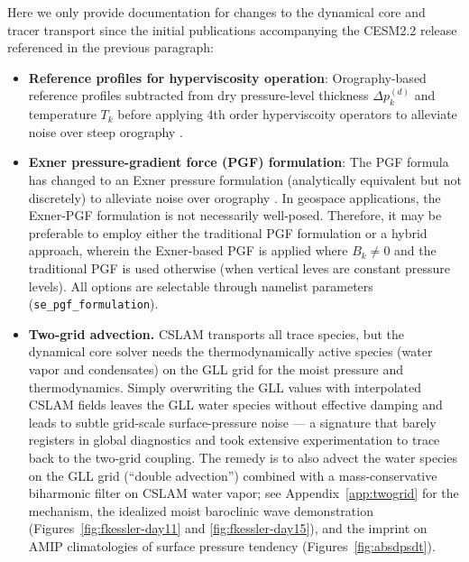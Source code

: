 \documentclass[draft]{agujournal2019}
\begin{document}
Here we only provide documentation for changes to the dynamical core and tracer transport since the initial publications accompanying the CESM2.2 release referenced in the previous paragraph:
\begin{itemize}
\item {\bf{Reference profiles for hyperviscosity operation}}: Orography-based reference profiles subtracted from dry pressure-level thickness $\Delta p^{(d)}_k$ and temperature $T_k$ before applying 4th order hyperviscoity operators to alleviate noise over steep orography \cite[Appendix A1]{refprof}.
\item {\bf{Exner pressure-gradient force (PGF) formulation}}: The PGF formula has changed to an Exner pressure formulation (analytically equivalent but not discretely) to alleviate noise over orography \cite[Appendix A2]{refprof}. In geospace applications, the Exner-PGF formulation is not necessarily well-posed. Therefore, it may be preferable to employ either the traditional PGF formulation or a hybrid approach, wherein the Exner-based PGF is applied where $B_k \neq 0$ and the traditional PGF is used otherwise (when vertical leves are constant pressure levels). All options are selectable through namelist parameters (\verb+se_pgf_formulation+).
  \item {\bf{Two-grid advection.}} CSLAM transports all trace species, but the
  dynamical core solver needs the thermodynamically active species (water vapor
  and condensates) on the GLL grid for the moist pressure and thermodynamics.
  Simply overwriting the GLL values with interpolated CSLAM fields leaves the
  GLL water species without effective damping and leads to subtle grid-scale
  surface-pressure noise --- a signature that barely registers in global
  diagnostics and took extensive experimentation to trace back to the two-grid
  coupling. The remedy is to also advect the water species on the GLL grid
  (``double advection'') combined with a mass-conservative biharmonic filter on
  CSLAM water vapor; see Appendix~\ref{app:twogrid} for the mechanism, the
  idealized moist baroclinic wave demonstration
  (Figures~\ref{fig:fkessler-day11} and \ref{fig:fkessler-day15}), and the
  imprint on AMIP climatologies of surface pressure tendency  (Figures~\ref{fig:absdpsdt}).
  

\end{itemize}
\end{document}
